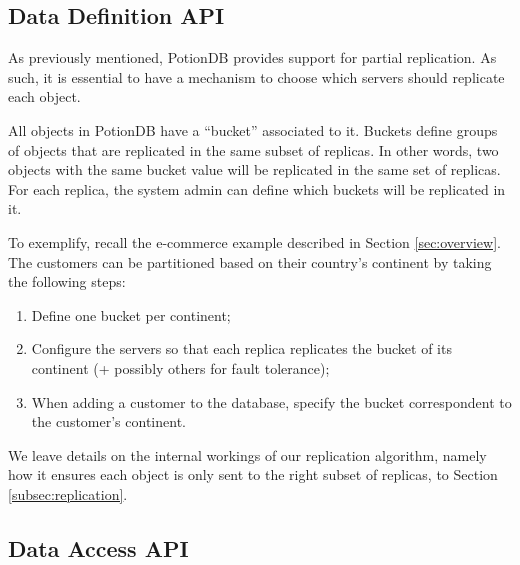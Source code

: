 \documentclass[sigplan,10pt]{acmart}
\begin{document}
\subsection{Data Definition API}
\label{subsec:old_dataAPI}

As previously mentioned, PotionDB provides support for partial replication.
As such, it is essential to have a mechanism to choose which servers should replicate each object.

All objects in PotionDB have a ``bucket'' associated to it.
Buckets define groups of objects that are replicated in the same subset of replicas. In other words, two objects with the same bucket value will be replicated in the same set of replicas.
For each replica, the system admin can define which buckets will be replicated in it.

To exemplify, recall the e-commerce example described in Section \ref{sec:overview}.
The customers can be partitioned based on their country's continent by taking the following steps: 

\begin{enumerate}
	\item Define one bucket per continent;
	\item Configure the servers so that each replica replicates the bucket of its continent (+ possibly others for fault tolerance);
	\item When adding a customer to the database, specify the bucket correspondent to the customer's continent.
\end{enumerate}

We leave details on the internal workings of our replication algorithm, namely how it ensures each object is only sent to the right subset of replicas, to Section \ref{subsec:replication}.





\subsection{Data Access API}
\end{document}
